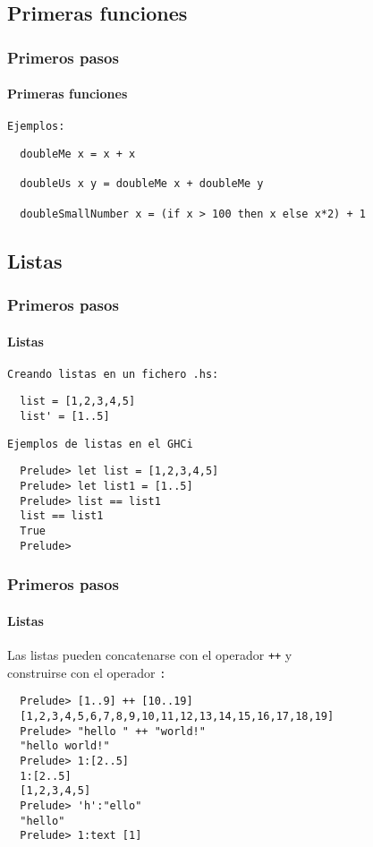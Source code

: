 \subsection{Primeras funciones}
\begin{frame}[fragile]
  \frametitle{Primeros pasos}
  \framesubtitle{Primeras funciones}

  \texttt{Ejemplos:}
  {\color{white}
    \begin{verbatim}
  doubleMe x = x + x

  doubleUs x y = doubleMe x + doubleMe y

  doubleSmallNumber x = (if x > 100 then x else x*2) + 1
    \end{verbatim}
  }
\end{frame}

\subsection{Listas}
\begin{frame}[fragile]
  \frametitle{Primeros pasos}
  \framesubtitle{Listas}
  \texttt{Creando listas en un fichero \verb~.hs~:}
  {\color{white}
    \begin{verbatim}
  list = [1,2,3,4,5]
  list' = [1..5]
    \end{verbatim}
  }
  \texttt{Ejemplos de listas en el GHCi}
  {\color{white}
    \begin{verbatim}
  Prelude> let list = [1,2,3,4,5]
  Prelude> let list1 = [1..5]
  Prelude> list == list1
  list == list1
  True
  Prelude>
    \end{verbatim}
  }
\end{frame}

\begin{frame}[fragile]
  \frametitle{Primeros pasos}
  \framesubtitle{Listas}
  Las listas pueden concatenarse con el operador \verb~++~ y\\construirse con el operador \verb~:~
  {\color{white}
    \begin{verbatim}
  Prelude> [1..9] ++ [10..19]
  [1,2,3,4,5,6,7,8,9,10,11,12,13,14,15,16,17,18,19]
  Prelude> "hello " ++ "world!"
  "hello world!"
  Prelude> 1:[2..5]
  1:[2..5]
  [1,2,3,4,5]
  Prelude> 'h':"ello"
  "hello"
  Prelude> 1:text [1]
    \end{verbatim}
  }
\end{frame}

